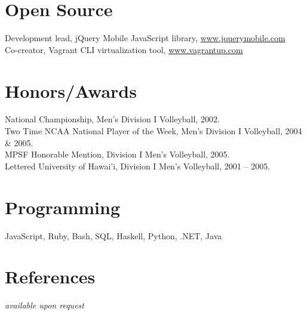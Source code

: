 \documentclass[margin,line]{resume}
\begin{document}
\begin{resume}
  \section{\mysidestyle Open Source}

  Development lead, jQuery Mobile JavaScript library, \url{www.jquerymobile.com} \vspace{1mm}\\
  Co-creator, Vagrant CLI virtualization tool, \url{www.vagrantup.com}

  \section{\mysidestyle Honors/Awards}
  National Championship, Men's Division I Volleyball, 2002.\vspace{1mm}\\
  Two Time NCAA National Player of the Week, Men's Division I Volleyball, 2004 \& 2005.\vspace{1mm}\\
  MPSF Honorable Mention, Division I Men's Volleyball, 2005.\vspace{1mm}\\
  Lettered University of Hawai'i, Division I Men's Volleyball, 2001 -- 2005.

  \section{\mysidestyle Programming}
  JavaScript, Ruby, Bash, SQL, Haskell, Python, .NET, Java

  \section{\mysidestyle References}
  \textsl{available upon request}

\end{resume}
\end{document}
